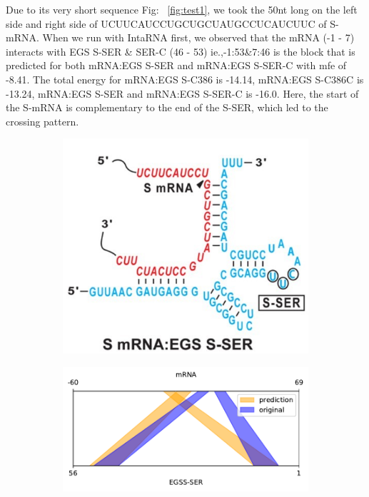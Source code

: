 \documentclass[twoside,a4paper]{report}
\numberwithin{equation}{section}
\begin{document}
	 
	 Due to its very short sequence Fig: ~\ref{fig:test1}, we took the 50nt long on the left side and right side of UCUUCAUCCUGCUGCUAUGCCUCAUCUUC of S-mRNA. When we run with IntaRNA first, we observed that the mRNA (-1 - 7) interacts with EGS S-SER \& SER-C (46 - 53) ie.,-1:53\&7:46 is the block that is predicted for both mRNA:EGS S-SER and mRNA:EGS S-SER-C with mfe of -8.41. The total energy for mRNA:EGS S-C386 is -14.14, mRNA:EGS S-C386C is -13.24, mRNA:EGS S-SER and mRNA:EGS S-SER-C is -16.0.  Here, the start of the S-mRNA is complementary to the end of the S-SER, which led to the crossing pattern.  \\
	 

	 
	 \begin{figure}[h!tb]
	 	\centering
	 	\begin{subfigure}{.25\textwidth}
	 		\centering
	 		\includegraphics[width=.9\linewidth]{mrnaegs}	
	 		\label{fig:mrnaegs}
	 	\end{subfigure}%
		\begin{subfigure}{.5\textwidth}
			\centering
			\includegraphics[width=.9\linewidth]{rricomparison7}

\end{subfigure}
\end{figure}
\end{document}
